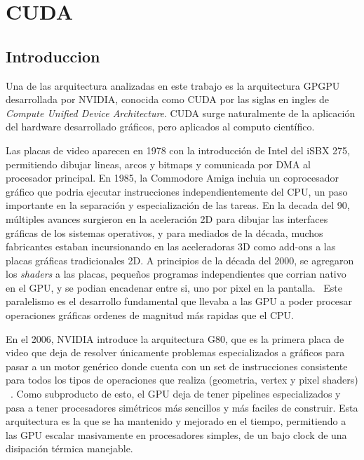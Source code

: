 \section{CUDA}

\subsection{Introduccion}

Una de las arquitectura analizadas en este trabajo es la arquitectura GPGPU desarrollada por NVIDIA, conocida
como CUDA por las siglas en ingles de \textit{Compute Unified Device Architecture}.
CUDA surge naturalmente de la aplicaci\'on del hardware desarrollado gr\'aficos, pero aplicados al computo cient\'ifico.

Las placas de video aparecen en 1978 con la introducci\'on de Intel del iSBX 275, permitiendo dibujar lineas,
arcos y bitmaps y comunicada por DMA al procesador principal. En 1985, la Commodore Amiga incluia un coprocesador
gr\'afico que podria ejecutar instrucciones independientemente del CPU, un paso importante en la separaci\'on
y especializaci\'on de las tareas. En la decada del 90, m\'ultiples
avances surgieron en la aceleraci\'on 2D para dibujar las interfaces gr\'aficas de los sistemas operativos,
y para mediados de la d\'ecada, muchos fabricantes estaban incursionando en las aceleradoras 3D como
add-ons a las placas gr\'aficas tradicionales 2D. A principios de la d\'ecada del 2000, se agregaron los
\textit{shaders} a las placas, peque\~nos programas independientes que corrian nativo en el GPU,
y se podian encadenar entre si, uno por pixel en la pantalla.~\cite{CG} Este paralelismo es el desarrollo fundamental
que llevaba a las GPU a poder procesar operaciones gr\'aficas ordenes de magnitud m\'as rapidas que el CPU.

En el 2006, NVIDIA introduce la arquitectura G80,
que es la primera placa de video que deja de resolver \'unicamente problemas especializados a gr\'aficos
para pasar a un motor gen\'erico donde cuenta con un set de instrucciones consistente para todos los
tipos de operaciones que realiza (geometria, vertex y pixel shaders) ~\cite{cudaHandbook}. Como subproducto de esto,
el GPU deja de tener pipelines especializados y pasa a tener procesadores sim\'etricos m\'as sencillos y m\'as
faciles de construir. Esta arquitectura es la que se ha mantenido y mejorado en el tiempo, permitiendo
a las GPU escalar masivamente en procesadores simples, de un bajo clock de una disipaci\'on t\'ermica
manejable.

